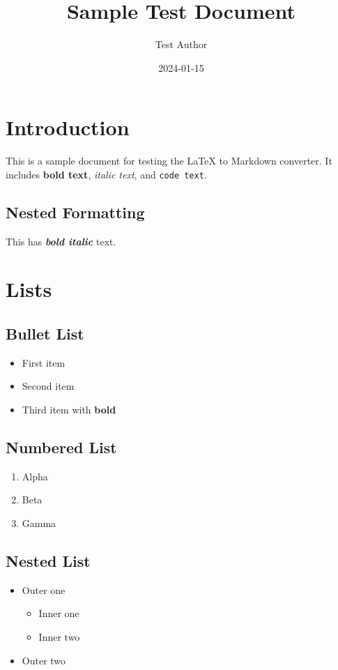 \documentclass{article}
\title{Sample Test Document}
\author{Test Author}
\date{2024-01-15}
\begin{document}
\maketitle

\section{Introduction}
This is a sample document for testing the LaTeX to Markdown converter.
It includes \textbf{bold text}, \textit{italic text}, and \texttt{code text}.

\subsection{Nested Formatting}
This has \textbf{\textit{bold italic}} text.

\section{Lists}

\subsection{Bullet List}
\begin{itemize}
\item First item
\item Second item
\item Third item with \textbf{bold}
\end{itemize}

\subsection{Numbered List}
\begin{enumerate}
\item Alpha
\item Beta
\item Gamma
\end{enumerate}

\subsection{Nested List}
\begin{itemize}
\item Outer one
  \begin{itemize}
  \item Inner one
  \item Inner two
  \end{itemize}
\item Outer two
\end{itemize}
\end{document}
